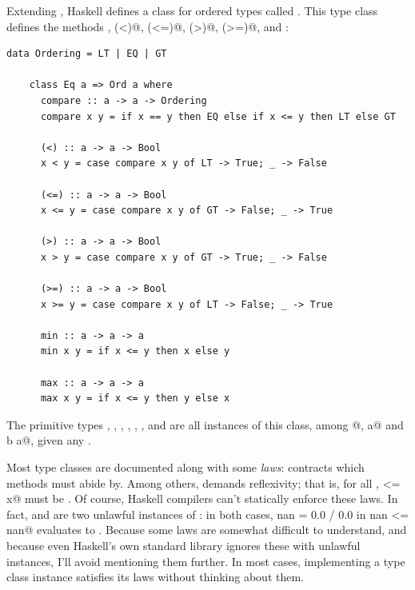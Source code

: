 \documentclass[UdineBachThesis,american,11pt]{PhdThesis}
\begin{document}
  Extending \lstinline@Eq@, Haskell defines a class for ordered types called
  \lstinline@Ord@. This type class defines the methods \lstinline@compare@,
  \lstinline@(<)@, \lstinline@(<=)@, \lstinline@(>)@, \lstinline@(>=)@,
  \lstinline@min@ and \lstinline@max@:

  \begin{lstlisting}[gobble=4,basicstyle=\ttfamily\small]
    data Ordering = LT | EQ | GT

    class Eq a => Ord a where
      compare :: a -> a -> Ordering
      compare x y = if x == y then EQ else if x <= y then LT else GT

      (<) :: a -> a -> Bool
      x < y = case compare x y of LT -> True; _ -> False

      (<=) :: a -> a -> Bool
      x <= y = case compare x y of GT -> False; _ -> True

      (>) :: a -> a -> Bool
      x > y = case compare x y of GT -> True; _ -> False

      (>=) :: a -> a -> Bool
      x >= y = case compare x y of LT -> False; _ -> True

      min :: a -> a -> a
      min x y = if x <= y then x else y

      max :: a -> a -> a
      max x y = if x <= y then y else x
  \end{lstlisting}

  The primitive types \lstinline@Int@, \lstinline@Word@, \lstinline@Integer@,
  \lstinline@Float@, \lstinline@Double@, \lstinline@Rational@, \lstinline@Bool@
  and \lstinline@Char@ are all instances of this class, among \lstinline@[a]@,
  \lstinline@Maybe a@ and \lstinline@Either b a@, given any \lstinline@a@.

  Most type classes are documented along with some \emph{laws}: contracts which
  methods must abide by. Among others, \lstinline@Ord@ demands reflexivity; that
  is, for all \lstinline@x@, \lstinline@x <= x@ must be \lstinline@True@. Of
  course, Haskell compilers can't statically enforce these laws. In fact,
  \lstinline@Float@ and \lstinline@Double@ are two unlawful instances of
  \lstinline@Ord@: in both cases, \lstinline@let nan = 0.0 / 0.0 in nan <= nan@
  evaluates to \lstinline@False@. Because some laws are somewhat difficult to
  understand, and because even Haskell's own standard library ignores these with
  unlawful instances, I'll avoid mentioning them further. In most cases,
  implementing a type class instance satisfies its laws without thinking about
  them.
\end{document}
